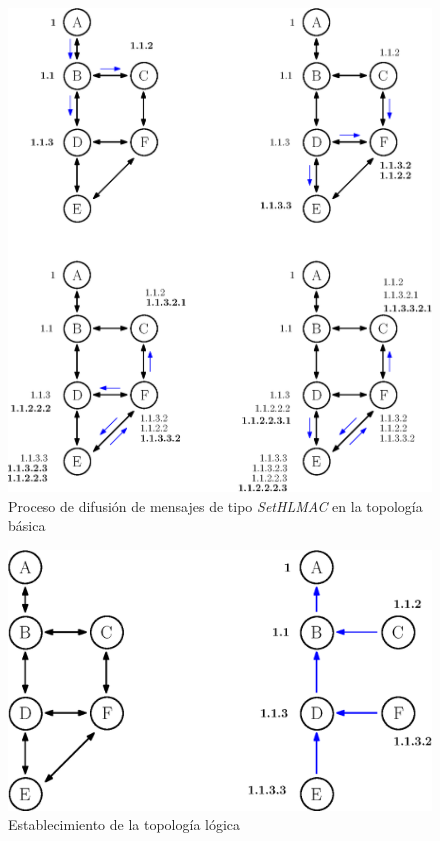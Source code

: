 \begin{figure}[ht]
    \centering
    \includegraphics[width=\textwidth]{archivos/img/dev/topo_sethlmac.eps}
    \caption{Proceso de difusión de mensajes de tipo \textit{SetHLMAC} en la topología básica}
    \label{fig:topo_sethlmac}
\end{figure}


\begin{figure}[ht]
    \centering
    \includegraphics[width=\textwidth]{archivos/img/dev/topo_logic.eps}
    \caption{Establecimiento de la topología lógica}
    \label{fig:topo_logic}
\end{figure}